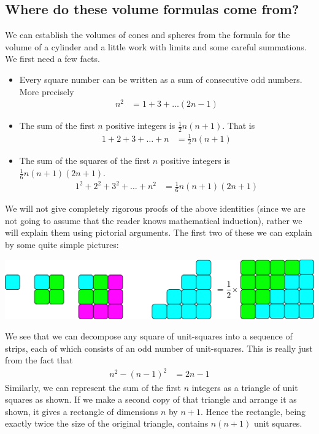 \subsection{Where do these volume formulas come from?}\label{apendix volume}
We can establish the volumes of cones and spheres from the formula for the volume of a
cylinder and a little work with limits and some careful summations. We first need a few
facts.
\begin{itemize}
 \item Every square number can be written as a sum of consecutive odd numbers. More
precisely
  \begin{align*}
  n^2 &= 1 + 3 + \dots (2n-1)
\end{align*}
 \item The sum of the first $n$ positive integers is $\frac{1}{2} n(n+1)$. That is
\begin{align*}
  1 + 2 +3 +\dots +n &= \frac{1}{2}n(n+1)
\end{align*}
 \item The sum of the squares of the first $n$ positive integers is $\frac{1}{6}
n(n+1)(2n+1)$.
\begin{align*}
  1^2 + 2^2 +3^2 +\dots + n^2 &= \frac{1}{6}n(n+1)(2n+1)
\end{align*}
\end{itemize}
We will not give completely rigorous proofs of the above identities (since we are not
going to assume that the reader knows mathematical induction), rather we will explain
them using pictorial arguments. The first two of these we can explain by some quite simple
pictures:
\begin{center}
 \includegraphics[width=\textwidth]{sums1}
\end{center}
We see that we can decompose any square of unit-squares into a sequence of strips, each
of which consists of an odd number of unit-squares. This is really just from the fact that
\begin{align*}
  n^2 - (n-1)^2 &= 2n-1
\end{align*}
Similarly, we can represent the sum of the first $n$ integers as a triangle of unit
squares as shown. If we make a second copy of that triangle and arrange it as shown, it
gives a rectangle of dimensions $n$ by $n+1$. Hence the rectangle, being exactly twice the
size of the original triangle, contains $n(n+1)$ unit squares.

